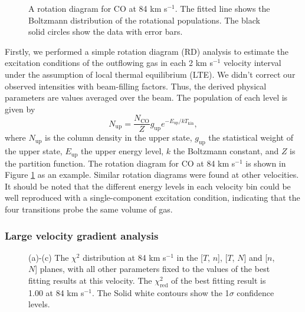 \begin{figure}[tbp]
\caption{A rotation diagram for CO at 84 km s$^{-1}$.  The fitted line shows the Boltzmann distribution of the rotational populations. The black solid circles show the data with error bars. \label{fig:figrd}}
\end{figure}

Firstly, we performed a simple rotation diagram (RD) analysis \citep{1999ApJ...517..209G} to estimate the excitation conditions of the outflowing gas in each 2 km s$^{-1}$ velocity interval under the assumption of local thermal equilibrium (LTE). We didn't correct our observed intensities with beam-filling factors. Thus, the derived physical parameters are values averaged over the beam. The population of each level is given by 
\begin{equation}
N_{\mathrm{up}} = \frac{N_\mathrm{CO}}{Z} g_\mathrm{up} e^{-E_\mathrm{up}/kT_\mathrm{kin}},
\end{equation}
where $N_\mathrm{up}$ is the column density in the upper state, $g_\mathrm{up}$ the statistical weight of the upper state, $E_\mathrm{up}$ the upper energy level, $k$ the Boltzmann constant, and $Z$ is the partition function.
The rotation diagram for CO at 84 km s$^{-1}$ is shown in Figure \ref{fig:figrd} as an example. Similar rotation diagrams were found at other velocities. It should be noted that the different energy levels in each velocity bin could be well reproduced with a single-component excitation condition, indicating that the four transitions probe the same volume of gas.  

\subsubsection{Large velocity gradient analysis\label{subsec:LVG}}

\begin{figure}[!tbp]
\caption{(a)-(c) The $\chi^2$ distribution at 84 km s$^{-1}$ in the [$T$, $n$], [$T$, $N$] and [$n$, $N$] planes, with all other parameters fixed to the values of the best fitting results at this velocity. The $\chi^2_{\mathrm{red}}$ of the best fitting result is 1.00 at 84 km s$^{-1}$. The Solid white contours show the 1$\sigma$ confidence levels. \label{fig:figchi}}
\end{figure}

